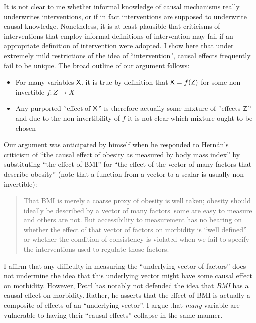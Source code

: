 It is not clear to me whether informal knowledge of causal mechanisms really underwrites interventions, or if in fact interventions are supposed to underwrite causal knowledge. Nonetheless, it is at least plausible that criticisms of interventions that employ informal definitions of intervention may fail if an appropriate definition of intervention were adopted. I show here that under extremely mild restrictions of the idea of ``intervention'', causal effects frequently fail to be unique. The broad outline of our argument follows:
\begin{itemize}
	\item For many variables $\mathsf{X}$, it is true by definition that $\mathsf{X}=f(\mathsf{Z})$ for some non-invertible $f:Z\to X$
	\item Any purported ``effect of $\mathsf{X}$'' is therefore actually some mixture of ``effects $\mathsf{Z}$'' and due to the non-invertibility of $f$ it is not clear which mixture ought to be chosen
\end{itemize}

Our argument was anticipated by \citet{pearl_does_2018} himself when he responded to Hern\'{a}n's criticism of ``the causal effect of obesity as measured by body mass index'' by substituting ``the effect of BMI'' for ``the effect of the vector of many factors that describe obesity'' (note that a function from a vector to a scalar is usually non-invertible):

\begin{quote}
That BMI is merely a coarse proxy of obesity is well taken; obesity should ideally be described by a vector of many factors, some are easy to measure and others are not. But accessibility to measurement has no bearing on whether the effect of that vector of factors on morbidity is ``well defined'' or whether the condition of consistency is violated when we fail to specify the interventions used to regulate those factors.
\end{quote}

I affirm that any difficulty in measuring the ``underlying vector of factors'' does not undermine the idea that this underlying vector might have some causal effect on morbidity. However, Pearl has notably not defended the idea that \emph{BMI} has a causal effect on morbidity. Rather, he asserts that the effect of BMI is actually a composite of effects of an ``underlying vector''. I argue that \emph{many} variable are vulnerable to having their ``causal effects'' collapse in the same manner.


